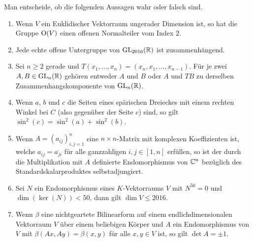 \documentclass[a4paper,10pt]{scrartcl}
\begin{document}
\begin{question}
  Man entscheide, ob die folgenden Aussagen wahr oder falsch sind.
  \begin{enumerate}[leftmargin=*]
    \item
      Wenn $V$ ein Euklidischer Vektorraum ungerader Dimension ist, so hat die Gruppe $\mathrm{O}(V)$ einen offenen Normalteiler vom Index $2$.
    \item
      Jede echte offene Untergruppe von $\mathrm{GL}_{2016}(\mathbb{R})$ ist zusammenhängend.
    \item
      Sei $n \geq 2$ gerade und $T(x_1, \dotsc, x_n) = (x_n, x_1, \dotsc, x_{n-1})$.
      Für je zwei $A, B \in \mathrm{GL}_n(\mathbb{R})$ gehören entweder $A$ und $B$ oder $A$ und $TB$ zu derselben Zusammenhangskomponente von $\mathrm{GL}_n(\mathbb{R})$.
    \item
      Wenn $a$, $b$ und $c$ die Seiten eines spärischen Dreieckes mit einem rechten Winkel bei $C$ (also gegenüber der Seite $c$) sind, so gilt $\sin^2(c) = \sin^2(a) + \sin^2(b)$.
    \item
      Wenn $A = (a_{ij})_{i,j = 1}^n$ eine $n \times n$-Matrix mit komplexen Koeffizienten ist, welche $a_{ij} = \overline{a_{ji}}$ für alle ganzzahligen $i, j \in [1,n]$ erfüllen, so ist der durch die Multiplikation mit $A$ definierte Endomorphismus von $\mathbb{C}^n$ bezüglich des Standardskalarproduktes selbstadjungiert.
    \item
      Sei $N$ ein Endomorphismus eines $K$-Vektorraums $V$ mit $N^{50} = 0$ und $\dim(\ker(N)) < 50$, dann gilt $\dim V \leq 2016$.
    \item
      Wenn $\beta$ eine nichtgeartete Bilinearform auf einem endlichdimensionalen Vektorraum $V$ über einem beliebigen Körper und $A$ ein Endomorphismus von $V$ mit $\beta(Ax, Ay) = \beta(x, y)$ für alle $x, y \in V$ ist, so gilt $\det A = \pm 1$.
  \end{enumerate}
\end{question}
\end{document}
